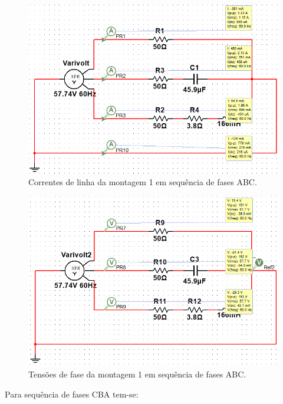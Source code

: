 \documentclass[a4paper,12pt,oneside,openany,table,xcdraw]{article}
\begin{document}
\begin{figure}[H]
\centering
\includegraphics[width=13.5cm]{m1-esquema-abc-correntes}
\caption{Correntes de linha da montagem 1 em sequência de fases ABC.}
\label{m1:IL}
\end{figure}
\begin{figure}[H]
\centering
\includegraphics[width=13.5cm]{m1-esquema-abc-vf}
\caption{Tensões de fase da montagem 1 em sequência de fases ABC.}
\label{m1:VF}
\end{figure}

\newpage
Para sequência de fases CBA tem-se: 
\end{document}

